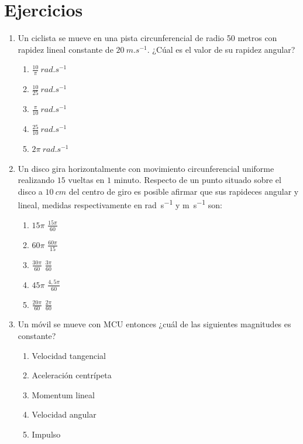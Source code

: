 \documentclass[letterpaper]{article}
\begin{document}
                                                                                                                
\section*{Ejercicios}


\begin{enumerate}

\item Un ciclista se mueve en una pista circunferencial de radio 50 metros con rapidez lineal constante de $20\ \si{m.s^{-1}}$. ¿Cúal es el valor de su rapidez angular?

\begin{enumerate}[label=\Alph*)]
\item $\frac{10}{\pi}\ \si{rad.s^{-1}}$
\item $\frac{10}{25}\ \si{rad.s^{-1}}$
\item $\frac{\pi}{10}\ \si{rad.s^{-1}}$
\item $\frac{25}{10}\ \si{rad.s^{-1}}$
\item $2\pi\ \si{rad.s^{-1}}$
\end{enumerate}

\item Un disco gira horizontalmente con movimiento circunferencial uniforme realizando $15$ vueltas en $1$ minuto. Respecto de un punto situado sobre el disco a $10\ \si{cm}$ del centro de giro es posible afirmar que sus rapideces angular y lineal, medidas respectivamente en \si{rad.s^{-1}} y \si{m.s^{-1}} son:
\begin{enumerate}[label=\Alph*)]
\item $15\pi$ \quad $\frac{15\pi}{60}$
\item $60\pi$ \quad $\frac{60\pi}{15}$
\item $\frac{30\pi}{60}$ \quad $\frac{3\pi}{60}$
\item $45\pi$ \quad $\frac{4,5\pi}{60}$
\item $\frac{20\pi}{60}$ \quad $\frac{2\pi}{60}$
\end{enumerate}

\item Un móvil se mueve con MCU entonces ¿cuál de las siguientes magnitudes es constante?
\begin{enumerate}[label=\Alph*)]
\item Velocidad tangencial
\item Aceleración centrípeta
\item Momentum lineal
\item Velocidad angular
\item Impulso
\end{enumerate}



\end{enumerate}
\end{document}
